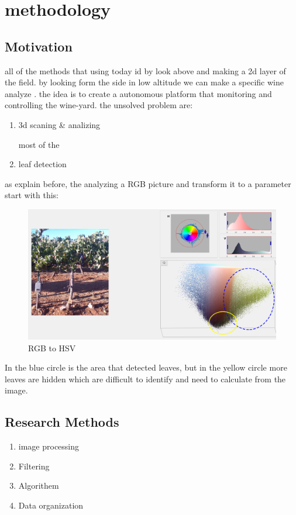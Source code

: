 \chapter{methodology}

\section{Motivation}
all of the methods that using today id by look above and making a 2d layer of the field.
by looking form the side in low altitude we can make a specific wine analyze .
the idea is to create a autonomous platform that monitoring and controlling  the wine-yard.
the unsolved problem are:
\begin{enumerate}


\item 3d scaning \&  analizing \par

most of the 

\item leaf detection

\end{enumerate}

as explain before, the analyzing a RGB picture and transform it to a parameter start with this:  


\begin{figure}[h]
    \centering
    \includegraphics[width=0.9\columnwidth]{images/rgb2hsv.png} \par
    \caption{RGB to HSV}
    \label{fig:rgb2hsv}
\end{figure}

In the blue circle is the area that detected leaves, but in the yellow circle more leaves are hidden which are difficult to identify and need to calculate from the image.

\section{Research Methods}

\begin{enumerate}

\item image processing

\item Filtering

\item Algorithem

\item Data organization

\end{enumerate}


